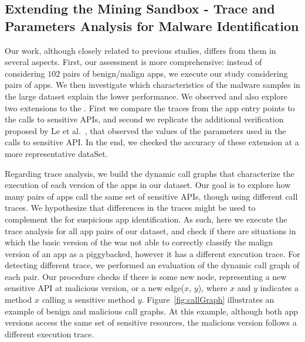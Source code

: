\subsection{Extending the Mining Sandbox - Trace and Parameters Analysis for Malware Identification}


Our work, although closely related to previous studies, differs from them in several aspects.  First, our assessment is more comprehensive: instead of considering $102$ pairs of benign/malign apps, we execute our study considering \apps pairs of apps. We then investigate which characteristics of the malware samples in the large dataset explain the lower performance. We observed and also explore two extensions to the \mas. First we compare the traces from the app entry points to the calls to sensitive APIs, and second we replicate the additional verification proposed by Le et al.~\cite{le2018towards}, that observed the values of the parameters used in the calls to sensitive API. In the end, we checked the accuracy of these extension at a more representative dataSet.

Regarding trace analysis, we build the dynamic call graphs that characterize the execution of each version of the apps in our dataset. Our goal is to explore how many pairs of apps call the same set of sensitive APIs, though using different call traces. We hypothesize that differences in the traces might be used to complement the \mas for suspicious app identification. As such, here we execute the trace analysis for all app pairs of our dataset, and check if there are situations in which the basic version of the \mas was not able to correctly classify the malign version of an app as a piggybacked, however it has a different execution trace. For detecting different trace, we performed an evaluation of the dynamic call graph of each pair. Our procedure checks if there is some new node, representing a new sensitive API at malicious version, or a new edge($x$, $y$), where $x$ and $y$ indicates a method $x$ calling a sensitive method $y$. Figure~\ref{fig:callGraph} illustrates an example of benign and malicious call graphs.
At this example, although both app versions access the same set of sensitive resources, the
malicious version follows a different execution trace. 


